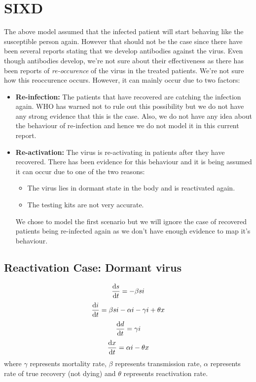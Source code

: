 \documentclass{article}
\begin{document}
	\section{SIXD}
	The above model assumed that the infected patient will start behaving like the susceptible person again. However that should not be the case since there have been several reports stating that we develop antibodies against the virus. Even though antibodies develop, we're not sure about their effectiveness as there has been reports of \textit{re-occurence} of the virus in the treated patients. We're not sure how this reoccurence occurs. However, it can mainly occur due to two factors:
	\begin{itemize}
		\item \textbf{Re-infection:} The patients that have recovered are catching the infection again. WHO has warned not to rule out this possibility but we do not have any strong evidence that this is the case. Also, we do not have any idea about the behaviour of re-infection and hence we do not model it in this current report.
		\item \textbf{Re-activation:} The virus is re-activating in patients after they have recovered. There has been evidence for this behaviour and it is being assumed it can occur due to one of the two reasons:
		\begin{itemize}
		\item The virus lies in dormant state in the body and is reactivated again.
		\item The testing kits are not very accurate.
		\end{itemize}
		We chose to model the first scenario but we will ignore the case of recovered patients being re-infected again as we don't have enough evidence to map it's behaviour.
	\end{itemize}

	\subsection{Reactivation Case: Dormant virus}
	\begin{equation*}
		\dv{s}{t} = -\beta si
	\end{equation*}
	\begin{equation*}
		\dv{i}{t} = \beta si - \alpha i - \gamma i + \theta x
	\end{equation*}
	\begin{equation*}
		\dv{d}{t} = \gamma i
	\end{equation*}
	\begin{equation*}
		\dv{x}{t} = \alpha i -\theta x
	\end{equation*}
	where $\gamma$ represents mortality rate, $\beta$ represents transmission rate, $\alpha$ represents rate of true recovery (not dying) and $\theta$ represents reactivation rate.
\end{document}
